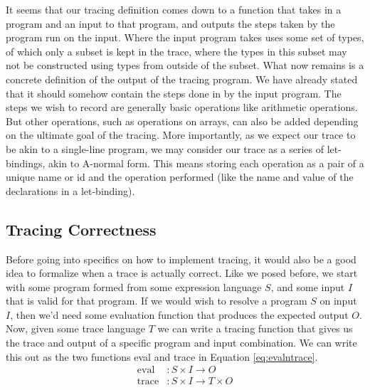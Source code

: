     It seems that our tracing definition comes down to a function that takes in a program and an input to that program, and outputs the steps taken by the program run on the input.
    Where the input program takes uses some set of types, of which only a subset is kept in the trace, where the types in this subset may not be constructed using types from outside of the subset.
    What now remains is a concrete definition of the output of the tracing program.
    We have already stated that it should somehow contain the steps done in by the input program.
    The steps we wish to record are generally basic operations like arithmetic operations.
    But other operations, such as operations on arrays, can also be added depending on the ultimate goal of the tracing.
    More importantly, as we expect our trace to be akin to a single-line program, we may consider our trace as a series of let-bindings, akin to A-normal form\cn.
    This means storing each operation as a pair of a unique name or id and the operation performed (like the name and value of the declarations in a let-binding).
    
    \subsection{Tracing Correctness} \label{sec:correctness}
        Before going into specifics on how to implement tracing, it would also be a good idea to formalize when a trace is actually correct.
        Like we posed before, we start with some program formed from some expression language $S$, and some input $I$ that is valid for that program.
        If we would wish to resolve a program $S$ on input $I$, then we'd need some evaluation function that produces the expected output $O$.
        Now, given some trace language $T$ we can write a tracing function that gives us the trace and output of a specific program and input combination.
        We can write this out as the two functions eval and trace in Equation \ref{eq:evalntrace}.
        \begin{equation}
            \begin{aligned}
                \text{eval}&:S\times I\to O\\
                \text{trace}&:S\times I\to T\times O
            \end{aligned}
            \label{eq:evalntrace}
        \end{equation}

